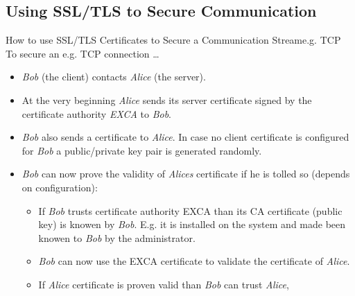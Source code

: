 ﻿\subsection{Using SSL/TLS to Secure Communication}

\begin{frame}{How to use SSL/TLS Certificates to Secure a Communication Stream}{e.g. TCP}
    To secure an e.g. TCP connection \ldots
    \begin{itemize}
        \item \alert{\textit{Bob}} (the client) contacts \alert{\textit{Alice}} (the server).
        \item  At the very beginning \alert{\textit{Alice}} sends its \alert{server certificate} signed by the \alert{certificate authority \textit{EXCA}} to \textit{Bob}.
        \item \alert{\textit{Bob} also sends a certificate} to \textit{Alice}. In case no \alert{client} certificate is configured for \textit{Bob} a public/private key pair is generated randomly.
        \item \textit{Bob} can now \alert{prove} the \alert{validity} of \textit{Alices} \alert{certificate} if he is tolled so (depends on \alert{configuration}):
        \begin{itemize}
            \item If \textit{Bob} \alert{trusts} certificate authority \alert{EXCA} than its \alert{CA certificate (public key) is knowen} by \textit{Bob}. E.g. it is installed on the system and made been knowen to \textit{Bob} by the \alert{administrator}.
            \item \textit{Bob} can now \alert{use the EXCA certificate} to \alert{validate} the \alert{certificate of \textit{Alice}}.
            \item If \textit{Alice} certificate is \alert{proven valid} than \textit{Bob} \alert{can trust} \textit{Alice},
        \end{itemize}
    \end{itemize}
\end{frame}
